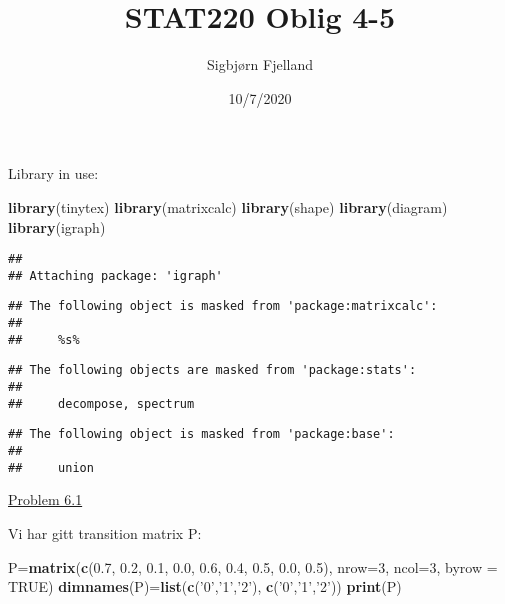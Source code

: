 \documentclass[]{article}
\title{STAT220 Oblig 4-5}
\author{Sigbjørn Fjelland}
\date{10/7/2020}
\newenvironment{Shaded}{\begin{snugshade}}{\end{snugshade}}
\newcommand{\DataTypeTok}[1]{\textcolor[rgb]{0.13,0.29,0.53}{#1}}
\newcommand{\DecValTok}[1]{\textcolor[rgb]{0.00,0.00,0.81}{#1}}
\newcommand{\FloatTok}[1]{\textcolor[rgb]{0.00,0.00,0.81}{#1}}
\newcommand{\KeywordTok}[1]{\textcolor[rgb]{0.13,0.29,0.53}{\textbf{#1}}}
\newcommand{\NormalTok}[1]{#1}
\newcommand{\OtherTok}[1]{\textcolor[rgb]{0.56,0.35,0.01}{#1}}
\newcommand{\StringTok}[1]{\textcolor[rgb]{0.31,0.60,0.02}{#1}}
\begin{document}
\maketitle

Library in use:

\begin{Shaded}
\begin{Highlighting}[]
\KeywordTok{library}\NormalTok{(tinytex)}
\KeywordTok{library}\NormalTok{(matrixcalc)}
\KeywordTok{library}\NormalTok{(shape)}
\KeywordTok{library}\NormalTok{(diagram)}
\KeywordTok{library}\NormalTok{(igraph)}
\end{Highlighting}
\end{Shaded}

\begin{verbatim}
## 
## Attaching package: 'igraph'
\end{verbatim}

\begin{verbatim}
## The following object is masked from 'package:matrixcalc':
## 
##     %s%
\end{verbatim}

\begin{verbatim}
## The following objects are masked from 'package:stats':
## 
##     decompose, spectrum
\end{verbatim}

\begin{verbatim}
## The following object is masked from 'package:base':
## 
##     union
\end{verbatim}

\underline{Problem 6.1}

Vi har gitt transition matrix P:

\begin{Shaded}
\begin{Highlighting}[]
\NormalTok{P=}\KeywordTok{matrix}\NormalTok{(}\KeywordTok{c}\NormalTok{(}\FloatTok{0.7}\NormalTok{, }\FloatTok{0.2}\NormalTok{, }\FloatTok{0.1}\NormalTok{, }\FloatTok{0.0}\NormalTok{, }\FloatTok{0.6}\NormalTok{, }\FloatTok{0.4}\NormalTok{, }\FloatTok{0.5}\NormalTok{, }\FloatTok{0.0}\NormalTok{, }\FloatTok{0.5}\NormalTok{), }\DataTypeTok{nrow=}\DecValTok{3}\NormalTok{, }\DataTypeTok{ncol=}\DecValTok{3}\NormalTok{, }\DataTypeTok{byrow =} \OtherTok{TRUE}\NormalTok{)}
\KeywordTok{dimnames}\NormalTok{(P)=}\KeywordTok{list}\NormalTok{(}\KeywordTok{c}\NormalTok{(}\StringTok{'0'}\NormalTok{,}\StringTok{'1'}\NormalTok{,}\StringTok{'2'}\NormalTok{), }\KeywordTok{c}\NormalTok{(}\StringTok{'0'}\NormalTok{,}\StringTok{'1'}\NormalTok{,}\StringTok{'2'}\NormalTok{))}
\KeywordTok{print}\NormalTok{(P)}
\end{Highlighting}
\end{Shaded}
\end{document}

